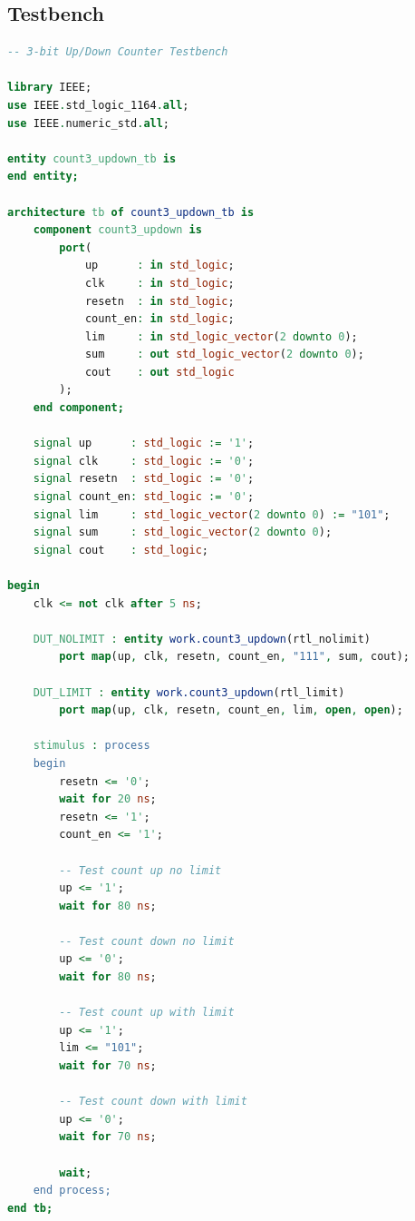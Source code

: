 \documentclass[12pt]{article}
\begin{document}
\subsection*{Testbench}

\begin{lstlisting}[language=VHDL]
-- 3-bit Up/Down Counter Testbench

library IEEE;
use IEEE.std_logic_1164.all;
use IEEE.numeric_std.all;

entity count3_updown_tb is
end entity;

architecture tb of count3_updown_tb is
    component count3_updown is
        port(
            up      : in std_logic;
            clk     : in std_logic;
            resetn  : in std_logic;
            count_en: in std_logic;
            lim     : in std_logic_vector(2 downto 0);
            sum     : out std_logic_vector(2 downto 0);
            cout    : out std_logic
        );
    end component;
    
    signal up      : std_logic := '1';
    signal clk     : std_logic := '0';
    signal resetn  : std_logic := '0';
    signal count_en: std_logic := '0';
    signal lim     : std_logic_vector(2 downto 0) := "101";
    signal sum     : std_logic_vector(2 downto 0);
    signal cout    : std_logic;
    
begin
    clk <= not clk after 5 ns;
    
    DUT_NOLIMIT : entity work.count3_updown(rtl_nolimit)
        port map(up, clk, resetn, count_en, "111", sum, cout);
    
    DUT_LIMIT : entity work.count3_updown(rtl_limit)
        port map(up, clk, resetn, count_en, lim, open, open);
    
    stimulus : process
    begin
        resetn <= '0';
        wait for 20 ns;
        resetn <= '1';
        count_en <= '1';
        
        -- Test count up no limit
        up <= '1';
        wait for 80 ns;
        
        -- Test count down no limit
        up <= '0';
        wait for 80 ns;
        
        -- Test count up with limit
        up <= '1';
        lim <= "101";
        wait for 70 ns;
        
        -- Test count down with limit
        up <= '0';
        wait for 70 ns;
        
        wait;
    end process;
end tb;
\end{lstlisting}
\end{document}
